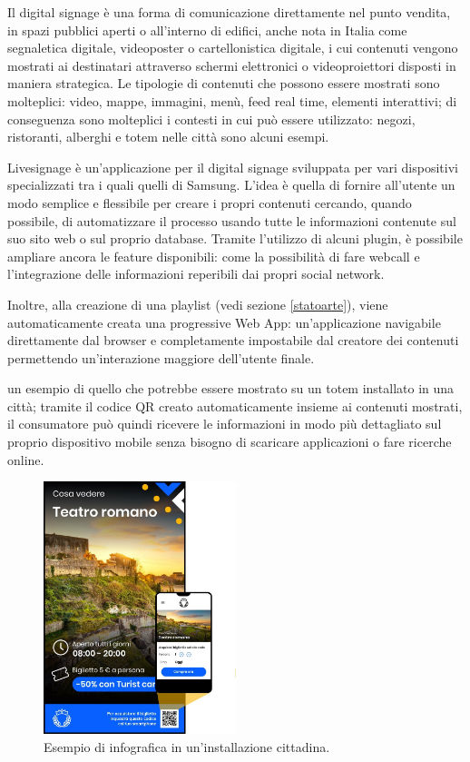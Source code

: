 Il digital signage è una forma di comunicazione direttamente nel punto vendita, in spazi pubblici aperti o all'interno di edifici, anche nota in Italia come segnaletica digitale, videoposter o cartellonistica digitale, i cui contenuti vengono mostrati ai destinatari attraverso schermi elettronici o videoproiettori disposti in maniera strategica. Le tipologie di contenuti che possono essere mostrati sono molteplici: video, mappe, immagini, menù, feed real time, elementi interattivi; di conseguenza sono molteplici i contesti in cui può essere utilizzato: negozi, ristoranti, alberghi e totem nelle città sono alcuni esempi.

Livesignage è un’applicazione per il digital signage sviluppata per vari dispositivi specializzati tra i quali quelli di Samsung. L’idea è quella di fornire all'utente un modo semplice e flessibile per creare i propri contenuti cercando, quando possibile, di automatizzare il processo usando tutte le informazioni contenute sul suo sito web o sul proprio database. Tramite l'utilizzo di alcuni plugin, è possibile ampliare ancora le feature disponibili: come la possibilità di fare webcall e l'integrazione delle informazioni reperibili dai propri social network.

Inoltre, alla creazione di una playlist (vedi sezione \ref*{statoarte}), viene automaticamente creata una progressive Web App: un'applicazione navigabile direttamente dal browser e completamente impostabile dal creatore dei contenuti permettendo un'interazione maggiore dell'utente finale.

 un esempio di quello che potrebbe essere mostrato su un totem installato in una città; tramite il codice QR creato automaticamente insieme ai contenuti mostrati, il consumatore può quindi ricevere le informazioni in modo più dettagliato sul proprio dispositivo mobile senza bisogno di scaricare applicazioni o fare ricerche online.

\begin{figure}[!htb]
    \centering
    \includegraphics[width= 0.5\textwidth]{images/Introduzione/LiveTurist.jpg} 
    \caption{Esempio di infografica in un'installazione cittadina.} 
    \label{fig:liveToursitSample}
\end{figure}



